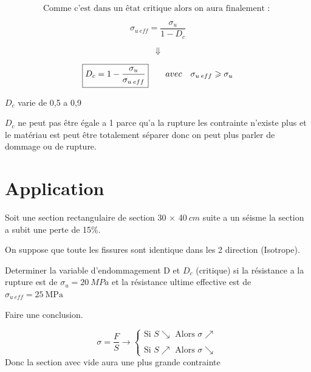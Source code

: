 \documentclass[12pt,a4paper]{report}
\renewcommand{\geq}{\geqslant}
\begin{document}
	\[ \text{Comme c'est dans un \^{e}tat critique alors on aura finalement : } \]
	
	\[ \sigma_{u \: eff} = \dfrac{\sigma_{u}}{1 - D_{c}} \]
	
	\[ \Downarrow \]
	
	\[ \fbox{$D_{c} = 1 - \dfrac{\sigma_{u}}{\sigma_{u \: eff}}$} \qquad avec \quad \sigma_{u \: eff} \geq \sigma_{u} \]
	
	\begin{tcolorbox}[colback=gray!20, colframe=black, title=Remarque]
		$D_{c}$ varie de 0,5 a 0,9
		
		\vspace{\baselineskip}
		$D_{c}$ ne peut pas \^{e}tre égale a 1 parce qu'a la rupture les contrainte n'existe plus et le matériau est peut être totalement séparer donc on peut plus parler de dommage ou de rupture.
	\end{tcolorbox}
	
	\vspace{\baselineskip}
	\vspace{\baselineskip}
	
	
	
	
	
	\section{Application}
	
	Soit une section rectangulaire de section 30 $\times$ 40$~\unit{cm}$ suite a un séisme la section a subit une perte de 15\%.
	
	On suppose que toute les fissures sont identique dans les 2 direction (Isotrope).
	
	Determiner la variable d'endommagement D et $D_{c}$ (critique) si la résistance a la rupture est de $\sigma_{u} = 20~\unit{MPa}$  et la résistance ultime effective est de $\sigma_{u \: eff} = 25~\unit{\mega \pascal}$
	
	Faire une conclusion.
	
	\begin{tcolorbox}[colback=gray!20, colframe=black, title=Remarque]
		\[
		\sigma = \dfrac{F}{S} \longrightarrow
		\begin{cases}
			\text{Si  } S \searrow \text{  Alors  } \sigma \nearrow \\ \\
			\text{Si  } S \nearrow \text{  Alors  } \sigma \searrow
		\end{cases}
		\]
		Donc la section avec vide aura une plus grande contrainte
	\end{tcolorbox}
	
\end{document}
